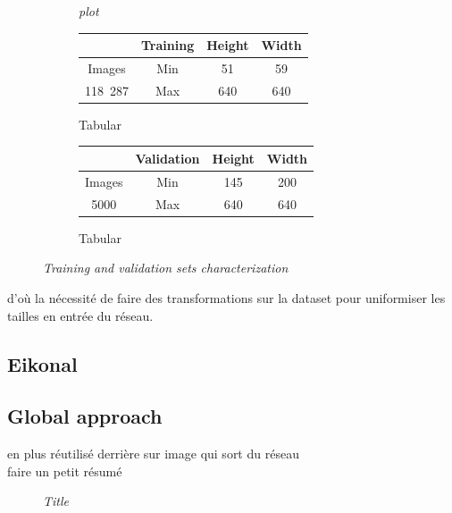 \documentclass{article}
\begin{document}
\begin{figure}[!ht]
\begin{subfigure}{.49\linewidth}
                \caption{\textit{plot}}
            \end{subfigure}
            \bigskip
            \begin{subfigure}{.49\linewidth}
                \center
                \begin{tabular}{|c||c|c|c|}
                    \hline
                     & Training & Height & Width \\
                    \hline
                    \hline
                    Images & Min & 51 & 59 \\
                    \hline
                    118~287 & Max & 640 & 640 \\
                    \hline
                \end{tabular}
                \caption{Tabular}
            \end{subfigure}
            \begin{subfigure}{.49\linewidth}
                \center
                \begin{tabular}{|c||c|c|c|}
                    \hline
                     & Validation & Height & Width \\
                    \hline
                    \hline
                    Images & Min & 145 & 200 \\
                    \hline
                    5000 & Max & 640 & 640 \\
                    \hline
                \end{tabular}
                \caption{Tabular}
            \end{subfigure}
            \caption{\textit{Training and validation sets characterization}}
        \end{figure}

        d'où la nécessité de faire des transformations sur la dataset pour uniformiser les tailles en entrée du réseau.

    \subsection{Eikonal}
    \subsection{Global approach}
    en plus réutilisé derrière sur image qui sort du réseau\\
    faire un petit résumé
    \begin{figure}[!ht]
        \centering
        \caption{\textit{Title}}
    \end{figure}
\end{document}
